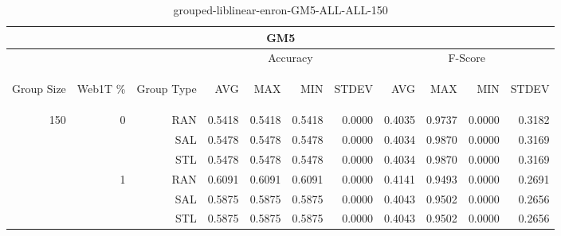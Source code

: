 \begin{center}
\begin{table}[htbp]
\begin{tabular}{ | r | r | r | r | r | r | r | r | r | r | r |}
\hline
\multicolumn{11}{|c|}{GM5}\\
\hline
 & & & \multicolumn{4}{|c|}{Accuracy} & \multicolumn{4}{|c|}{F-Score}\\ \cline{4-11}
\begin{sideways}Group Size\end{sideways} & \begin{sideways}Web1T \%\end{sideways} & \begin{sideways}Group Type\end{sideways} & \begin{sideways}AVG\end{sideways} & \begin{sideways}MAX\end{sideways} & \begin{sideways}MIN\end{sideways} & \begin{sideways}STDEV\end{sideways} & \begin{sideways}AVG\end{sideways} & \begin{sideways}MAX\end{sideways} & \begin{sideways}MIN\end{sideways} & \begin{sideways}STDEV\end{sideways}\\
\hline
\multirow{6}{*}{150}
 & \multirow{3}{*}{0} & RAN & 0.5418 & 0.5418 & 0.5418 & 0.0000 & 0.4035 & 0.9737 & 0.0000 & 0.3182\\ \cline{3-11}
 &   & SAL & 0.5478 & 0.5478 & 0.5478 & 0.0000 & 0.4034 & 0.9870 & 0.0000 & 0.3169\\ \cline{3-11}
 &   & STL & 0.5478 & 0.5478 & 0.5478 & 0.0000 & 0.4034 & 0.9870 & 0.0000 & 0.3169\\ \cline{2-11}
 & \multirow{3}{*}{1} & RAN & 0.6091 & 0.6091 & 0.6091 & 0.0000 & 0.4141 & 0.9493 & 0.0000 & 0.2691\\ \cline{3-11}
 &   & SAL & 0.5875 & 0.5875 & 0.5875 & 0.0000 & 0.4043 & 0.9502 & 0.0000 & 0.2656\\ \cline{3-11}
 &   & STL & 0.5875 & 0.5875 & 0.5875 & 0.0000 & 0.4043 & 0.9502 & 0.0000 & 0.2656\\ \cline{2-11}
\hline
\end{tabular}
\caption{grouped-liblinear-enron-GM5-ALL-ALL-150}
\end{table}
\end{center}

